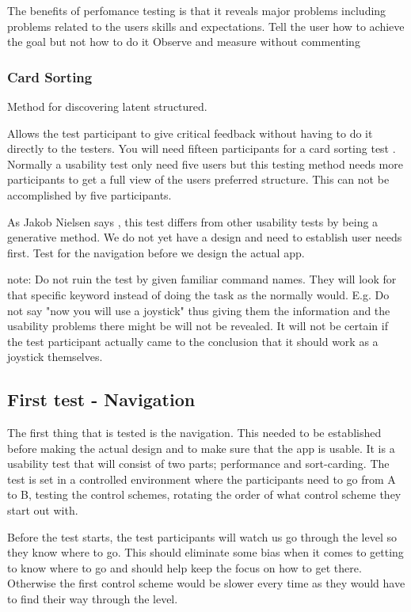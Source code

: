 The benefits of perfomance testing is that it reveals major problems including problems related to the users skills and expectations. \cite{performance}
Tell the user how to achieve the goal but not how to do it \cite{} 
Observe and measure without commenting\cite{}

\subsubsection{Card Sorting}
Method for discovering latent structured. \cite{cards}

Allows the test participant to give critical feedback without having to do it directly to the testers. 
You will need fifteen participants for a card sorting test \cite{cardSorting}. Normally a usability test only need five users but this testing method needs more participants to get a full view of the users preferred structure. This can not be accomplished by five participants. \cite{cardSorting}

As Jakob Nielsen says \cite{cardSorting}, this test differs from other usability tests by being a generative method. 
We do not yet have a design and need to establish user needs first. Test for the navigation before we design the actual app. 

note: Do not ruin the test by given familiar command names. They will look for that specific keyword instead of doing the task 
as the normally would. \cite{}
E.g. Do not say "now you will use a joystick" thus giving them the information and the usability problems there might be
will not be revealed. It will not be certain if the test participant actually came to the conclusion that it should work as a joystick
themselves. 

\subsection{First test - Navigation}

The first thing that is tested is the navigation. This needed to be established before making the actual design and to make sure that the app is usable.
It is a usability test that will consist of two parts; performance and sort-carding. 
The test is set in a controlled environment where the participants need to go from A to B, testing the control schemes, rotating the order of what control scheme they start out with.

Before the test starts, the test participants will watch us go through the level so they know where to go. This should eliminate some bias when it comes to getting to know where to go and should help keep the focus on how to get there. Otherwise the first control scheme would be slower every time as they would have to find their way through the level.

